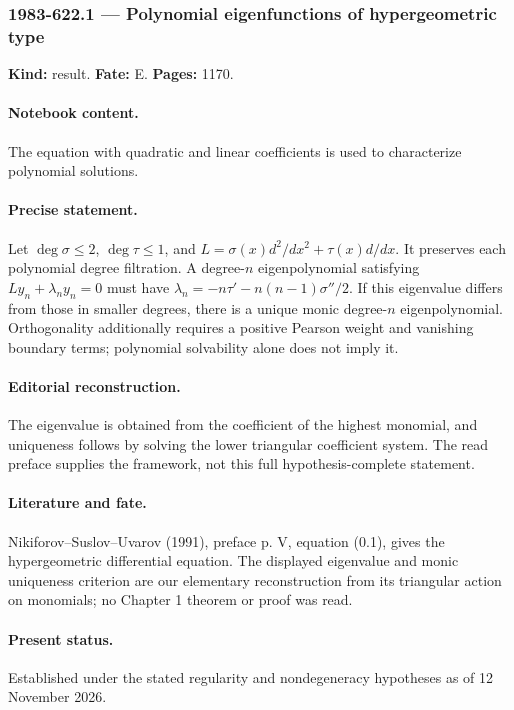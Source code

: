 \subsubsection{1983-622.1 --- Polynomial eigenfunctions of hypergeometric type}

\label{item:1983-622.1}

\noindent\textbf{Kind:} result. \textbf{Fate:} E. \textbf{Pages:} 1170.\par

\paragraph{Notebook content.} The equation with quadratic and linear coefficients is used to characterize polynomial solutions.

\paragraph{Precise statement.} Let \(\deg\sigma\le2\), \(\deg\tau\le1\), and \(L=\sigma(x)d^2/dx^2+\tau(x)d/dx\). It preserves each polynomial degree filtration. A degree-\(n\) eigenpolynomial satisfying \(Ly_n+\lambda_ny_n=0\) must have \(\lambda_n=-n\tau'-n(n-1)\sigma''/2\). If this eigenvalue differs from those in smaller degrees, there is a unique monic degree-\(n\) eigenpolynomial. Orthogonality additionally requires a positive Pearson weight and vanishing boundary terms; polynomial solvability alone does not imply it.

\paragraph{Editorial reconstruction.} The eigenvalue is obtained from the coefficient of the highest monomial, and uniqueness follows by solving the lower triangular coefficient system. The read preface supplies the framework, not this full hypothesis-complete statement.

\paragraph{Literature and fate.} Nikiforov–Suslov–Uvarov (1991), preface p. V, equation (0.1), gives the hypergeometric differential equation. The displayed eigenvalue and monic uniqueness criterion are our elementary reconstruction from its triangular action on monomials; no Chapter 1 theorem or proof was read.

\paragraph{Present status.} Established under the stated regularity and nondegeneracy hypotheses as of 12 November 2026.


